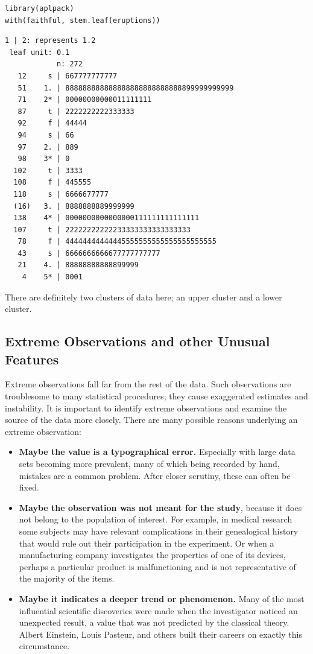 \documentclass[captions=tableheading]{scrbook}
\begin{document}
\lstset{language=R}
\begin{lstlisting}
library(aplpack)
with(faithful, stem.leaf(eruptions))
\end{lstlisting}


\begin{verbatim}
1 | 2: represents 1.2
 leaf unit: 0.1
            n: 272
   12     s | 667777777777
   51    1. | 888888888888888888888888888899999999999
   71    2* | 00000000000011111111
   87     t | 2222222222333333
   92     f | 44444
   94     s | 66
   97    2. | 889
   98    3* | 0
  102     t | 3333
  108     f | 445555
  118     s | 6666677777
  (16)   3. | 8888888889999999
  138    4* | 0000000000000000111111111111111
  107     t | 22222222222233333333333333333
   78     f | 44444444444445555555555555555555555
   43     s | 6666666666677777777777
   21    4. | 88888888888899999
    4    5* | 0001
\end{verbatim}

There are definitely two clusters of data here; an upper cluster and a lower cluster. 
\subsection{Extreme Observations and other Unusual Features}
\label{sec-3-2-5}
\label{sub-Extreme-Observations-and}


Extreme observations fall far from the rest of the data. Such observations are troublesome to many statistical procedures; they cause exaggerated estimates and instability. It is important to identify extreme observations and examine the source of the data more closely. There are many possible reasons underlying an extreme observation:

\begin{itemize}
\item \textbf{Maybe the value is a typographical error.} Especially with large data sets becoming more prevalent, many of which being recorded by hand, mistakes are a common problem. After closer scrutiny, these can often be fixed.
\item \textbf{Maybe the observation was not meant for the study}, because it does not belong to the population of interest. For example, in medical research some subjects may have relevant complications in their genealogical history that would rule out their participation in the experiment. Or when a manufacturing company investigates the properties of one of its devices, perhaps a particular product is malfunctioning and is not representative of the majority of the items.
\item \textbf{Maybe it indicates a deeper trend or phenomenon.} Many of the most influential scientific discoveries were made when the investigator noticed an unexpected result, a value that was not predicted by the classical theory. Albert Einstein, Louis Pasteur, and others built their careers on exactly this circumstance.
\end{itemize}
\end{document}

